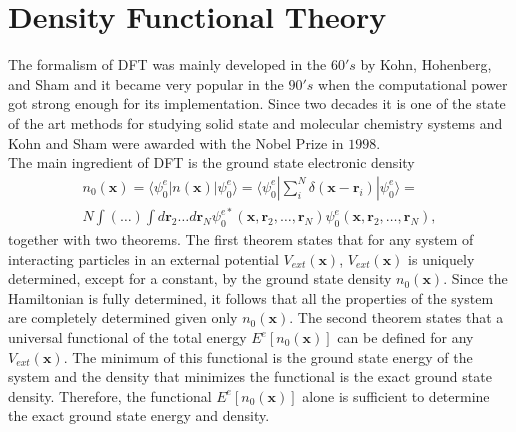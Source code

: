 \section{Density Functional Theory}
\label{density-functional-theory}

The formalism of DFT\cite{hohenberg1964inhomogeneous,kohn1965self} was mainly developed in the $60's$ by Kohn, Hohenberg, and Sham and it became very popular in the $90's$ when the computational power got strong enough for its 
implementation. Since two decades it is one of the state of the art methods for studying solid state and molecular chemistry systems and Kohn and Sham were awarded with the Nobel Prize in $1998$. \\

The main ingredient of DFT is the ground state electronic density
\begin{multline}
 n_{0}(\mathbf{x})=\langle\psi_{0}^{e}|n(\mathbf{x})|\psi_{0}^{e}\rangle=\langle\psi_{0}^{e}|\sum_{i}^{N}\delta(\mathbf{x}-\mathbf{r}_{i})|\psi_{0}^{e}\rangle= \\
 N\int(\dots)\int d\mathbf{r}_{2}\dots d\mathbf{r}_{N}\psi_{0}^{e*}(\mathbf{x},\mathbf{r}_{2},\dots,\mathbf{r}_{N})\psi_{0}^{e}(\mathbf{x},\mathbf{r}_{2},\dots,\mathbf{r}_{N}),
\end{multline}
together with two theorems. The first theorem states that for any system of interacting particles in an external potential $V_{ext}(\mathbf{x})$, $V_{ext}(\mathbf{x})$ is uniquely determined, except for a constant, by the 
ground state density $n_{0}(\mathbf{x})$. Since the Hamiltonian is fully determined, it follows that all the properties of the system are completely determined given only $n_{0}(\mathbf{x})$. The second theorem states that 
a universal functional of the total energy $E^{e}[n_{0}(\mathbf{x})]$ can be defined for any $V_{ext}(\mathbf{x})$. The minimum of this functional is the ground state energy of the system and the density that minimizes 
the functional is the exact ground state density. Therefore, the functional $E^{e}[n_{0}(\mathbf{x})]$ alone is sufficient to determine the exact ground state energy and density. \\

